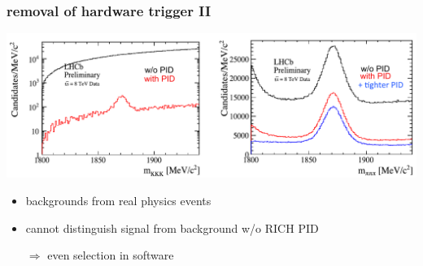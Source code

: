 \documentclass[table,xcolor=dvipsnames,professionalfonts]{beamer}
\begin{document}
\begin{frame}
  \frametitle{removal of hardware trigger II}
  \includegraphics[width=\textwidth]{./stor.pdf}
  \begin{itemize}
      \item backgrounds from real physics events
      \item cannot distinguish signal from background w/o RICH PID
      \item[$\Rightarrow$] even selection in software
  \end{itemize}
\end{frame}
\end{document}
